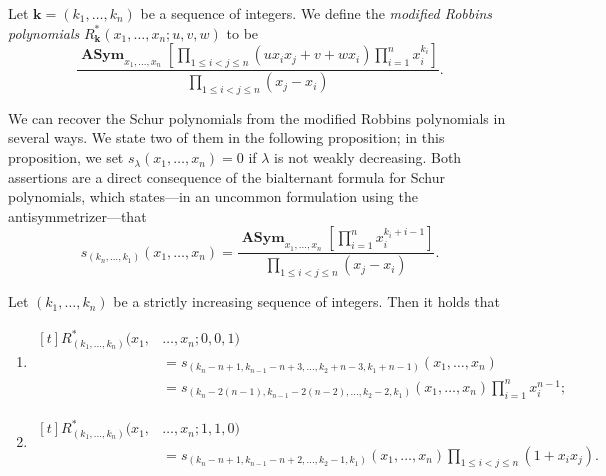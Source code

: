 \documentclass[ALCO, Unicode]{cedram}
\newcommand{\deff}[1]{\emph{#1}}
\DeclareMathOperator{\asym}{\mathbf{ASym}}
\newcommand{\boldk}{\boldsymbol{k}}
\begin{document}
	\begin{dfn}
		Let $\boldk=(k_{1},\ldots,k_{n})$ be a sequence of integers. We define the \deff{modified Robbins polynomials} $R_{\boldk}^{\ast}(x_{1},\ldots,x_{n};u,v,w)$ to be
		\begin{equation*}
			\frac{\asym_{x_{1},\ldots,x_{n}}\left[\prod\limits_{1\le i<j\le n}(ux_{i}x_{j}+v+wx_{i})\prod\limits_{i=1}^{n}x_{i}^{k_{i}}\right]}{\prod\limits_{1\le i<j\le n}(x_{j}-x_{i})}.
		\end{equation*}
	\end{dfn}
	
	We can recover the Schur polynomials from the modified Robbins polynomials in several ways. We state two of them in the following proposition; in this proposition, we set $s_\lambda(x_1,\ldots,x_n)=0$ if $\lambda$ is not weakly decreasing. Both assertions are a direct consequence of the bialternant formula for Schur polynomials, which states---in an uncommon formulation using the antisymmetrizer---that
	\begin{equation*}
		s_{(k_n,\dots,k_1)}(x_1,\dots,x_n)=\frac{\asym_{x_{1},\ldots,x_{n}}\left[\prod\limits_{i=1}^{n}x_{i}^{k_{i}+i-1}\right]}{\prod\limits_{1\le i<j\le n}(x_{j}-x_{i})}.
	\end{equation*}
	
	\begin{prop}
		\label{prop:RobbinsToSchur}
		Let $(k_{1},\ldots,k_{n})$ be a strictly increasing sequence of integers. Then it holds that
		\begin{enumerate}[label=(\roman*)]
			\item\label{prop:RobbinsToSchur1}
			$\begin{aligned}[t]
				R_{(k_{1},\ldots,k_{n})}^{\ast}(x_{1},&\ldots,x_{n};0,0,1)\\
				&= s_{(k_n-n+1,k_{n-1}-n+3,\dots,k_2+n-3,k_1+n-1)}(x_{1},\ldots,x_{n})\\
				&=s_{(k_n-2(n-1),k_{n-1}-2(n-2),\dots,k_2-2,k_1)}(x_{1},\ldots,x_{n}) \prod_{i=1}^{n} x_i^{n-1};
			\end{aligned}$		
			\item\label{prop:RobbinsToSchur2}
			$\begin{aligned}[t] R_{(k_{1},\ldots,k_{n})}^{\ast}(x_{1},&\ldots,x_{n};1,1,0)\\
				&= s_{(k_n-n+1,k_{n-1}-n+2,\dots,k_2-1,k_1)}(x_{1},\ldots,x_{n}) \prod\limits_{1 \le i < j \le n} (1+x_i x_j).
			\end{aligned}$
		\end{enumerate}
	\end{prop}
	
\end{document}
